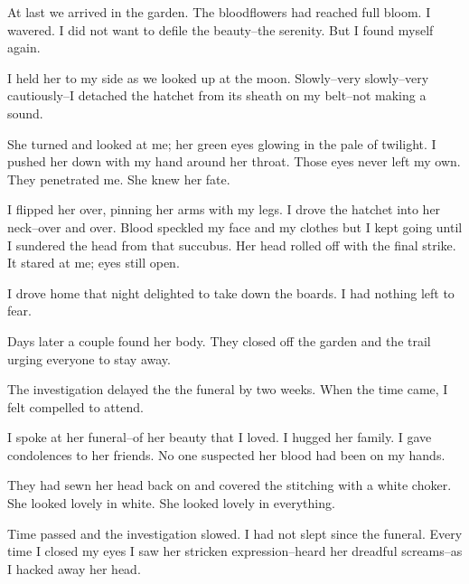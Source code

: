 \documentclass{article}
\begin{document}
At last we arrived in the garden.
The bloodflowers had reached full bloom.
I wavered.  I did not want to defile the beauty--the serenity.
But I found myself again.


I held her to my side as we looked up at the moon.
Slowly--very slowly--very cautiously--I
detached the hatchet from its sheath on my belt--not making a sound.


She turned and looked at me;
her green eyes glowing in the pale of twilight.
I pushed her down with my hand around her throat.
Those eyes never left my own. They penetrated me.
She knew her fate.


I flipped her over, pinning her arms with my legs.
I drove the hatchet into her neck--over and over.
Blood speckled my face and my clothes but I kept going
until I sundered the head from that succubus.
Her head rolled off with the final strike.
It stared at me; eyes still open.


I drove home that night delighted to take down the boards.
I had nothing left to fear.
\VV


\noindent
Days later a couple found her body.
They closed off the garden and the trail
urging everyone to stay away.


The investigation delayed the the funeral by two weeks.
When the time came, I felt compelled to attend.


I spoke at her funeral--of her beauty that I loved.
I hugged her family.
I gave condolences to her friends.
No one suspected her blood had been on my hands.


They had sewn her head back on and covered the
stitching with a white choker.
She looked lovely in white.
She looked lovely in everything.
\VV


\noindent
Time passed and the investigation slowed.
I had not slept since the funeral.
Every time I closed my eyes I saw her stricken expression--heard
her dreadful screams--as I hacked away her head.
\end{document}

